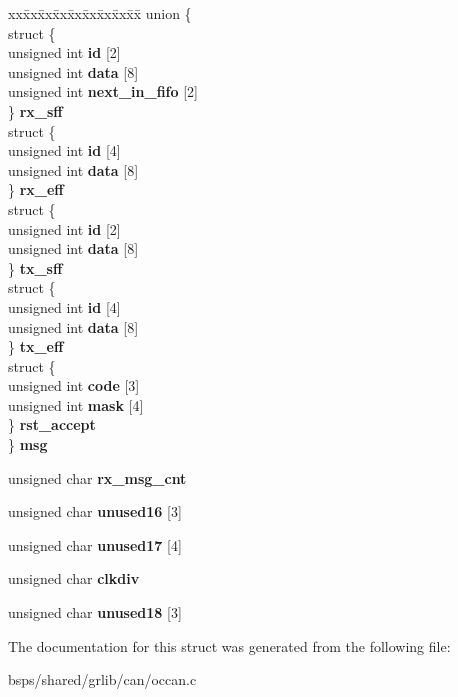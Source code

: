 \begin{DoxyCompactItemize}
\begin{tabbing}
xx\=xx\=xx\=xx\=xx\=xx\=xx\=xx\=xx\=\kill
union \{\\
\>struct \{\\
\>\>unsigned int {\bfseries id} \mbox{[}2\mbox{]}\\
\>\>unsigned int {\bfseries data} \mbox{[}8\mbox{]}\\
\>\>unsigned int {\bfseries next\_in\_fifo} \mbox{[}2\mbox{]}\\
\>\} {\bfseries rx\_sff}\\
\>struct \{\\
\>\>unsigned int {\bfseries id} \mbox{[}4\mbox{]}\\
\>\>unsigned int {\bfseries data} \mbox{[}8\mbox{]}\\
\>\} {\bfseries rx\_eff}\\
\>struct \{\\
\>\>unsigned int {\bfseries id} \mbox{[}2\mbox{]}\\
\>\>unsigned int {\bfseries data} \mbox{[}8\mbox{]}\\
\>\} {\bfseries tx\_sff}\\
\>struct \{\\
\>\>unsigned int {\bfseries id} \mbox{[}4\mbox{]}\\
\>\>unsigned int {\bfseries data} \mbox{[}8\mbox{]}\\
\>\} {\bfseries tx\_eff}\\
\>struct \{\\
\>\>unsigned int {\bfseries code} \mbox{[}3\mbox{]}\\
\>\>unsigned int {\bfseries mask} \mbox{[}4\mbox{]}\\
\>\} {\bfseries rst\_accept}\\
\} {\bfseries msg}\\

\end{tabbing}\item 
\mbox{\label{structpelican32__regs_afe2ba352b78fdf2e362a38580026651b}} 
unsigned char {\bfseries rx\+\_\+msg\+\_\+cnt}
\item 
\mbox{\label{structpelican32__regs_ab24256a460a375450afdb2ff22694028}} 
unsigned char {\bfseries unused16} \mbox{[}3\mbox{]}
\item 
\mbox{\label{structpelican32__regs_a48eecc485d4609f8d57d259199eec3a4}} 
unsigned char {\bfseries unused17} \mbox{[}4\mbox{]}
\item 
\mbox{\label{structpelican32__regs_a6c0f66a3355a92c099cf36061cb41d47}} 
unsigned char {\bfseries clkdiv}
\item 
\mbox{\label{structpelican32__regs_acae1166e6a46c8a427c6fac638fe5c29}} 
unsigned char {\bfseries unused18} \mbox{[}3\mbox{]}
\end{DoxyCompactItemize}


The documentation for this struct was generated from the following file\+:\begin{DoxyCompactItemize}
\item 
bsps/shared/grlib/can/occan.\+c\end{DoxyCompactItemize}
